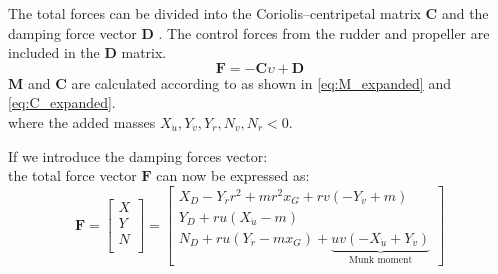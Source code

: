 The total forces can be divided into the Coriolis–centripetal matrix $\mathbf{C}$ and the damping force vector $\mathbf{D}$ \cite{fossenHandbookMarineCraft2011}. The control forces from the rudder and propeller are included in the $\mathbf{D}$ matrix.
\begin{equation}
    \label{eq:upsilon1d}
\mathbf{F} = - \mathbf{C} \upsilon + \mathbf{D}
\end{equation}
$\mathbf{M}$ and $\mathbf{C}$ are calculated according to \textcite{fossenHandbookMarineCraft2011} as shown in \autoref{eq:M_expanded} and \autoref{eq:C_expanded}. 
\begin{equation}
    \label{eq:M_expanded}
    
\end{equation}
\begin{equation}
    \label{eq:C_expanded}
    
\end{equation}
where the added masses $X_{\dot{u}},Y_{\dot{v}},Y_{\dot{r}},N_{\dot{v}},N_{\dot{r}} < 0$. 

If we introduce the damping forces vector:
\begin{equation}
    \label{eq:D}
    
\end{equation}
the total force vector $\mathbf{F}$ can now be expressed as:
\begin{equation}
    \label{eq:F_expanded}
\mathbf{F} = 
\left[\begin{matrix}
X \\
Y \\
N \\
\end{matrix}\right]
=
\left[\begin{matrix}X_{D} - Y_{\dot{r}} r^{2} + m r^{2} x_{G} + r v \left(- Y_{\dot{v}} + m\right)\\Y_{D} + r u \left(X_{\dot{u}} - m\right)\\N_{D} + r u \left(Y_{\dot{r}} - m x_{G}\right) + \underbrace{u v \left(- X_{\dot{u}} + Y_{\dot{v}}\right)}_{\text{Munk moment}} \end{matrix}\right]
\end{equation}
\newline
\vspace{0.3cm}

